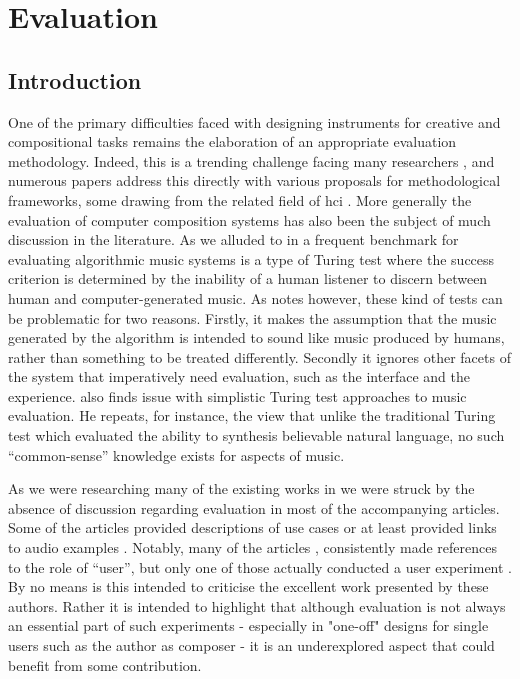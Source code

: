 \chapter{Evaluation}
\label{chap:evaluation}

\section{Introduction}

One of the primary difficulties faced with designing instruments for creative and compositional tasks remains the elaboration of an appropriate evaluation methodology. Indeed, this is a trending challenge facing many researchers \citep{Barbosa2015}, and numerous papers address this directly with various proposals for methodological frameworks, some drawing from the related field of \acrshort{hci} \citep{Hsu2009, Kiefer2008a, Hiraga2004}. More generally the evaluation of computer composition systems has also been the subject of much discussion in the literature. As we alluded to in  a frequent benchmark for evaluating algorithmic music systems is a type of Turing test where the success criterion is determined by the inability of a human listener to discern between human and computer-generated music. As \citep{Abdulla2002} notes however, these kind of tests can be problematic for two reasons. Firstly, it makes the assumption that the music generated by the algorithm is intended to sound like music produced by humans, rather than something to be treated differently. Secondly it ignores other facets of the system that imperatively need evaluation, such as the interface and the experience. \cite{Pachet2015} also finds issue with simplistic Turing test approaches to music evaluation. He repeats, for instance, the view that unlike the traditional Turing test which evaluated the ability to synthesis believable natural language, no such “common-sense” knowledge exists for aspects of music.

As we were researching many of the existing works in  we were struck by the absence of discussion regarding evaluation in most of the accompanying articles. Some of the articles provided descriptions of use cases \citep{Cardle2003} or at least provided links to audio examples \citep{Sturm2004}. Notably, many of the articles \citep{Simon2005}, \citep{Hackbarth2010} consistently made references to the role of “user”, but only one of those actually conducted a user experiment \citep{Aucouturier2005}. By no means is this intended to criticise the excellent work presented by these authors. Rather it is intended to highlight that although evaluation is not always an essential part of such experiments - especially in "one-off" designs for single users such as the author as composer - it is an underexplored aspect that could benefit from some contribution.


